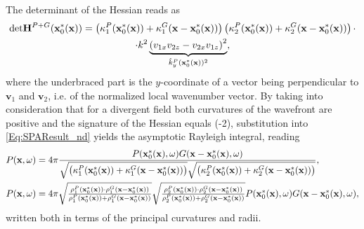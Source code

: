 The determinant of the Hessian reads as
\begin{multline}
\label{Eq:HF_approx:H_det_Rayleigh}
\small
\mathrm{det} \mathbf{H}^{P+G}(\mathbf{x}_0^*(\mathbf{x})) = 
\left(\kappa_1^P(\mathbf{x}_0^*(\mathbf{x})) + \kappa_1^G(\mathbf{x}-\mathbf{x}_0^*(\mathbf{x}))\right)
\left(\kappa_2^P(\mathbf{x}_0^*(\mathbf{x})) + \kappa_2^G(\mathbf{x}-\mathbf{x}_0^*(\mathbf{x}))\right)
\cdot \\ \cdot
k^2 \underbrace{\left( v_{1 x}v_{2 z}-v_{2 x}v_{1 z} \right)^2}_{\hat{k}_y^P(\mathbf{x}_0^*(\mathbf{x}))^2},
\end{multline}
where the underbraced part is the $y$-coordinate of a vector being perpendicular to $\mathbf{v}_1$ and $\mathbf{v}_2$, i.e. of the normalized local wavenumber vector.
By taking into consideration that for a divergent field both curvatures of the wavefront are positive and the signature of the Hessian equals (-2), substitution into \eqref{Eq:SPAResult_nd} yields the asymptotic Rayleigh integral, reading
\begin{align}
\label{eq:HF_approx:asymptotic_rayleigh}
P(\mathbf{x},\omega) &= 
4\pi \frac{P(\mathbf{x}_0^*(\mathbf{x}),\omega) G(\mathbf{x}-\mathbf{x}_0^*(\mathbf{x}),\omega)}
{\sqrt{\left(\kappa_1^P(\mathbf{x}_0^*(\mathbf{x})) + \kappa_1^G(\mathbf{x}-\mathbf{x}_0^*(\mathbf{x}))\right)}
\sqrt{\left(\kappa_2^P(\mathbf{x}_0^*(\mathbf{x})) + \kappa_2^G(\mathbf{x}-\mathbf{x}_0^*(\mathbf{x}))\right)}}, \\
P(\mathbf{x},\omega) &= 4\pi
\textstyle \sqrt{\frac{\rho_1^P(\mathbf{x}_0^*(\mathbf{x})) \cdot \rho_1^G(\mathbf{x}-\mathbf{x}_0^*(\mathbf{x}))}{\rho_1^P(\mathbf{x}_0^*(\mathbf{x})) + \rho_1^G(\mathbf{x}-\mathbf{x}_0^*(\mathbf{x}))}}
\sqrt{\frac{\rho_2^P(\mathbf{x}_0^*(\mathbf{x})) \cdot \rho_2^G(\mathbf{x}-\mathbf{x}_0^*(\mathbf{x}))}{\rho_2^P(\mathbf{x}_0^*(\mathbf{x})) + \rho_2^G(\mathbf{x}-\mathbf{x}_0^*(\mathbf{x}))}}
P(\mathbf{x}_0^*(\mathbf{x}),\omega) G(\mathbf{x}-\mathbf{x}_0^*(\mathbf{x}),\omega), \nonumber
\end{align}
written both in terms of the principal curvatures and radii.

